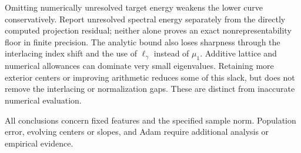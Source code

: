 Omitting numerically unresolved target energy weakens the lower curve
conservatively. Report unresolved spectral energy separately from the directly
computed projection residual; neither alone proves an exact nonrepresentability
floor in finite precision. The analytic bound also loses sharpness through the
interlacing index shift and the use of $\ell_\gamma$ instead of $\mu_1$.
Additive lattice and numerical allowances can dominate very small eigenvalues.
Retaining more exterior centers or improving arithmetic reduces some of this
slack, but does not remove the interlacing or normalization gaps. These are
distinct from inaccurate numerical evaluation.

All conclusions concern fixed features and the specified sample norm.
Population error, evolving centers or slopes, and Adam require additional
analysis or empirical evidence.
